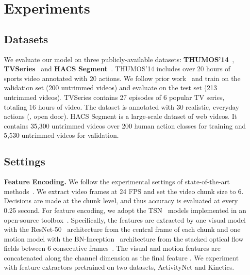 \vspace{-1mm}
\section{Experiments}

\vspace{-1mm}
\subsection{Datasets}
\label{exp:datasets}
\vspace{-1mm}

We evaluate our model on three publicly-available datasets: \textbf{THUMOS'14}~\cite{THUMOS14}, \textbf{TVSeries}~\cite{de2016online} and \textbf{HACS Segment}~\cite{Zhao_2019_ICCV}.
THUMOS'14 includes over 20 hours of sports video annotated with 20 actions.
We follow prior work~\cite{xu2019temporal,eun2020learning} and train on the validation set (200 untrimmed videos) and evaluate on the test set (213 untrimmed videos).
TVSeries contains 27 episodes of 6 popular TV series, totaling 16 hours of video.
The dataset is annotated with 30 realistic, everyday actions (\eg, open door).
HACS Segment is a large-scale dataset of web videos. It contains 35,300 untrimmed videos over 200 human action classes for training and 5,530 untrimmed videos for validation.

\vspace{-2mm}
\subsection{Settings}
\label{exp:settings}
\vspace{-1mm}

\textbf{Feature Encoding.}
We follow the experimental settings of state-of-the-art methods~\cite{xu2019temporal,eun2020learning}.
We extract video frames at 24 FPS and set the video chunk size to 6.
Decisions are made at the chunk level, and thus accuracy is evaluated at every 0.25 second.
For feature encoding, we adopt the TSN~\cite{wang2016temporal} models implemented in an open-source toolbox~\cite{2020mmaction2}.
Specifically, the features are extracted by one visual model with the ResNet-50~\cite{he2016deep} architecture from the central frame of each chunk and one motion model with the BN-Inception~\cite{ioffe2015batch} architecture from the stacked optical flow fields between 6 consecutive frames~\cite{wang2016temporal}.
The visual and motion features are concatenated along the channel dimension as the final feature .
We experiment with feature extractors pretrained on two datasets, ActivityNet and Kinetics.

